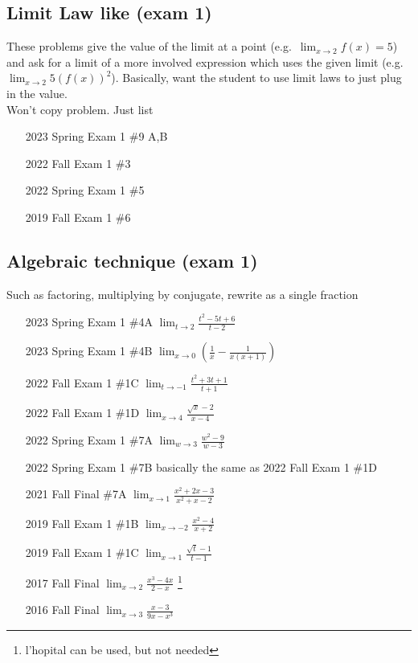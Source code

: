 \documentclass[10pt]{scrartcl}
\theoremstyle{definition}
\begin{document}
\subsection{Limit Law like (exam 1)}
These problems give the value of the limit at a point (e.g.~$\lim_{x\to2} f(x) =
5$) and ask for a limit of a more involved expression which uses the given
limit (e.g.~$\lim_{x\to2} 5(f(x))^2$).
Basically, want the student to use limit laws to just plug in the value.
\\
Won't copy problem. Just list
\begin{enumerate}
  \item [2023 Spring Exam 1 \#9 A,B]
  \item [2022 Fall Exam 1 \#3]
  \item [2022 Spring Exam 1 \#5]
  \item [2019 Fall Exam 1 \#6]
\end{enumerate}

\subsection{Algebraic technique (exam 1)}
Such as factoring, multiplying by conjugate, rewrite as a single fraction
\begin{enumerate}
\item [2023 Spring Exam 1 \#4A] $\lim_{t\to2}\frac{t^2-5t+6}{t-2}$
\item [2023 Spring Exam 1 \#4B] $\lim_{x\to0}\left( \frac1x - \frac{1}{x(x+1)} \right)$
\item [2022 Fall Exam 1 \#1C] $\lim_{t\to-1} \frac{t^2+3t+1}{t+1}$
\item [2022 Fall Exam 1 \#1D] $\lim_{x\to4} \frac{\sqrt x-2}{x-4}$
\item [2022 Spring Exam 1 \#7A] $\lim_{w\to3} \frac{w^2-9}{w-3}$
\item [2022 Spring Exam 1 \#7B] basically the same as 2022 Fall Exam 1 \#1D
\item[2021 Fall Final \#7A] $\lim_{x\to1} \frac{x^2+2x-3}{x^2+x-2}$
\item [2019 Fall Exam 1 \#1B] $\lim_{x\to-2} \frac{x^2-4}{x+2}$
\item [2019 Fall Exam 1 \#1C] $\lim_{x\to1} \frac{\sqrt t-1}{t-1}$
\item [2017 Fall Final] $\lim_{x\to2} \frac{x^3 - 4x}{2-x}$ \footnote{l'hopital can be used, but not needed}
\item [2016 Fall Final] $\lim_{x\to 3} \frac{x-3}{9x-x^3}$
\end{enumerate}
\end{document}
